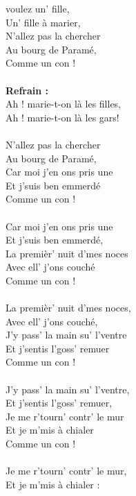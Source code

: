 
 voulez un' fille,
\\Un' fille à marier,
\\N'allez pas la chercher
\\Au bourg de Paramé,
\\Comme un con !
\\\\\textbf{Refrain :}
\\Ah ! marie-t-on là les filles,
\\Ah ! marie-t-on là les gars!
\\\\N'allez pas la chercher
\\Au bourg de Paramé,
\\Car moi j'en ons pris une
\\Et j'suis ben emmerdé
\\Comme un con !
\\\\Car moi j'en ons pris une
\\Et j'suis ben emmerdé,
\\La premièr' nuit d'mes noces
\\Avec ell' j'ons couché
\\Comme un con !
\\\\La premièr' nuit d'mes noces,
\\Avec ell' j'ons couché,
\\J'y pass' la main su' l'ventre
\\Et j'sentis l'goss' remuer
\\Comme un con !
\\\\J'y pass' la main su' l'ventre,
\\Et j'sentis l'goss' remuer,
\\Je me r'tourn' contr' le mur
\\Et je m'mis à chialer
\\Comme un con !
\breakpage
\\\\Je me r'tourn' contr' le mur,
\\Et je m'mis à chialer :
